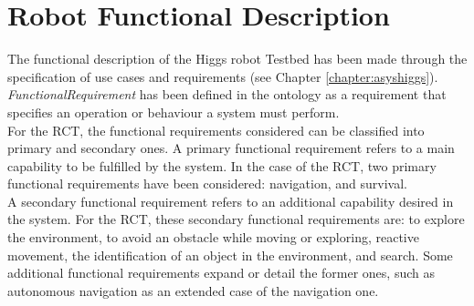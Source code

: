 \section{Robot Functional Description}

The functional description of the Higgs robot Testbed has been made
through the specification of use cases and requirements (see Chapter
\ref{chapter:asyshiggs}). \emph{FunctionalRequirement} has been defined in the
ontology as a requirement that specifies an operation or behaviour a system must perform.\\

For the RCT, the functional requirements considered can be classified into primary  and secondary ones. A primary functional requirement refers to a main capability to be fulfilled by the system. In the case of the RCT, two primary functional requirements have been considered: navigation, and survival. \\

A secondary functional requirement refers to an additional capability desired in the system. For the RCT, these secondary functional requirements are: to explore the environment, to avoid an obstacle while moving or exploring, reactive movement, the identification of an object in the environment, and search. Some additional functional requirements expand or detail the former ones, such as autonomous navigation as an extended case of the navigation one.\\

